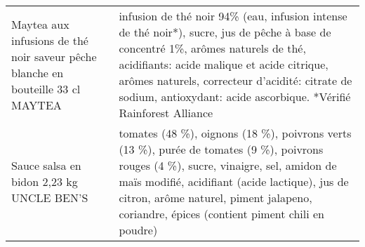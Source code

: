 \begin{longtable}{p{5cm}p{10cm}}
                          Maytea aux infusions de thé noir saveur pêche blanche en bouteille 33 cl MAYTEA &                                                                                                                                                                                                                                                                                                                                                                                                                                                                                                                                                                                                                                                                                                                                  infusion de thé noir 94\% (eau, infusion intense de thé noir*), sucre, jus de pêche à base de concentré 1\%, arômes naturels de thé, acidifiants: acide malique et acide citrique, arômes naturels, correcteur d'acidité: citrate de sodium, antioxydant: acide ascorbique.  *Vérifié Rainforest Alliance \\
                                                                 Sauce salsa en bidon 2,23 kg UNCLE BEN'S &                                                                                                                                                                                                                                                                                                                                                                                                                                                                                                                                                                                                                                                                                                                                                      tomates (48 \%), oignons (18 \%), poivrons verts (13 \%), purée de tomates (9 \%), poivrons rouges (4 \%), sucre, vinaigre, sel, amidon de maïs modifié, acidifiant (acide lactique), jus de citron, arôme naturel, piment jalapeno, coriandre, épices (contient piment chili en poudre) \\

\end{longtable}
